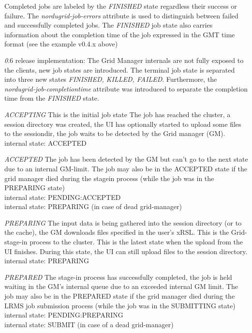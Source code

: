\documentclass{article}
\begin{document}
Completed jobs are labeled by the {\it FINISHED} state regardless their
success or failure. The {\it nordugrid-job-errors} attribute is used to 
distinguish between failed and successfully completed jobs.
The {\it FINISHED} job state also carries information about the completion
time of the job expressed in the GMT time format (see the example v0.4.x above)



{\emph 0.6 release implementation:}
The Grid Manager internals are not fully exposed to the clients, 
new job states are introduced. The terminal job state is separated into
three new states {\it FINISHED, KILLED, FAILED}. 
Furthermore, the {\it nordugrid-job-completiontime} attribute was introduced to 
separate the completion time from the {\it FINISHED} state.

{\it ACCEPTING}
This is the initial job state
The job has reached the cluster, a session directory was created, 
the UI has optionally started to upload some files to the sessiondir,
the job waits to be detected by the Grid manager (GM). \\
internal state: ACCEPTED


{\it ACCEPTED}
The job has been detected by the GM but 
can't go to the next state due to an internal GM-limit. The job may also be in
the ACCEPTED state if the grid manager died during the stagein process 
(while the job was in the PREPARING state)\\
internal state: PENDING:ACCEPTED \\
internal state: PREPARING (in case of dead grid-manager)


{\it PREPARING}
The input data is being gathered into the session directory
(or to the cache), the GM downloads files specified in the user's xRSL.
This is the Grid-stage-in process to the cluster.
This is the latest state when the upload from the UI finishes. 
During this state, the UI can still upload files to the session directory. \\
internal state: PREPARING


{\it PREPARED}
The stage-in process has successfully completed, 
the job is held waiting in the GM's internal queue due to an  
exceeded internal GM limit. 
The job may also be in the PREPARED state if the grid manager died during the LRMS
job submission  process (while the job was in the SUBMITTING state)\\
internal state: PENDING:PREPARING \\
internal state: SUBMIT (in case of a dead grid-manager)
\end{document}

